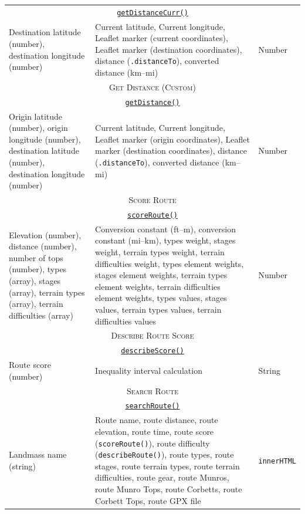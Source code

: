 \documentclass[11pt, english]{article}
\begin{document}
\begin{center}
\begin{longtable}{p{4cm}p{6cm}p{2cm}}
		\hline
		\multicolumn{3}{c}{\underline{\texttt{getDistanceCurr()}}}\\
		Destination latitude (number), destination longitude (number) & Current latitude, Current longitude, Leaflet marker (current coordinates), Leaflet marker (destination coordinates), distance (\texttt{.distanceTo}), converted distance (km--mi) & Number\\
		\hline
		\multicolumn{3}{c}{\textsc{Get Distance (Custom)}}\\
		\hline
		\multicolumn{3}{c}{\underline{\texttt{getDistance()}}}\\
		Origin latitude (number), origin longitude (number), destination latitude (number), destination longitude (number) & Current latitude, Current longitude, Leaflet marker (origin coordinates), Leaflet marker (destination coordinates), distance (\texttt{.distanceTo}), converted distance (km--mi) & Number\\
		\hline
		\multicolumn{3}{c}{\textsc{Score Route}}\\
		\hline
		\multicolumn{3}{c}{\underline{\texttt{scoreRoute()}}}\\
		Elevation (number), distance (number), number of tops (number), types (array), stages (array), terrain types (array), terrain difficulties (array) & Conversion constant (ft--m), conversion constant (mi--km), types weight, stages weight, terrain types weight, terrain difficulties weight, types element weights, stages element weights, terrain types element weights, terrain difficulties element weights, types values, stages values, terrain types values, terrain difficulties values & Number\\
		\hline
		\multicolumn{3}{c}{\textsc{Describe Route Score}}\\
		\hline
		\multicolumn{3}{c}{\underline{\texttt{describeScore()}}}\\
		Route score (number) & Inequality interval calculation & String\\
		\hline
		\multicolumn{3}{c}{\textsc{Search Route}}\\
		\hline
		\multicolumn{3}{c}{\underline{\texttt{searchRoute()}}}\\
		Landmass name (string) & Route name, route distance, route elevation, route time, route score (\texttt{scoreRoute()}), route difficulty (\texttt{describeRoute()}), route types, route stages, route terrain types, route terrain difficulties, route gear, route Munros, route Munro Tops, route Corbetts, route Corbett Tops, route GPX file & \texttt{innerHTML}\\

\end{longtable}
\end{center}
\end{document}
